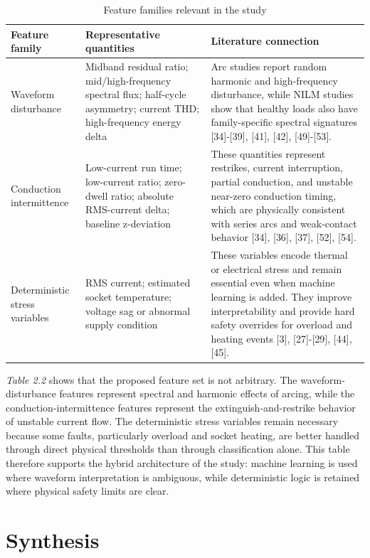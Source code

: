 \begin{table}[H]
  \centering
  \caption{Feature families relevant in the study}
  \label{tab:ch2-feature-families}
  \begin{tabular}{p{}p{}p{}}
    \toprule
    \textbf{Feature family} & \textbf{Representative quantities} & \textbf{Literature connection} \\
    \midrule
    Waveform disturbance & Midband residual ratio; mid/high-frequency spectral flux; half-cycle asymmetry; current THD; high-frequency energy delta & Arc studies report random harmonic and high-frequency disturbance, while NILM studies show that healthy loads also have family-specific spectral signatures {[}34{]}-{[}39{]}, {[}41{]}, {[}42{]}, {[}49{]}-{[}53{]}. \\
    Conduction intermittence & Low-current run time; low-current ratio; zero-dwell ratio; absolute RMS-current delta; baseline z-deviation & These quantities represent restrikes, current interruption, partial conduction, and unstable near-zero conduction timing, which are physically consistent with series arcs and weak-contact behavior {[}34{]}, {[}36{]}, {[}37{]}, {[}52{]}, {[}54{]}. \\
    Deterministic stress variables & RMS current; estimated socket temperature; voltage sag or abnormal supply condition & These variables encode thermal or electrical stress and remain essential even when machine learning is added. They improve interpretability and provide hard safety overrides for overload and heating events {[}3{]}, {[}27{]}-{[}29{]}, {[}44{]}, {[}45{]}. \\
    \bottomrule
  \end{tabular}
\end{table}

\textit{Table 2.2} shows that the proposed feature set is not arbitrary. The
waveform-disturbance features represent spectral and harmonic effects of
arcing, while the conduction-intermittence features represent the
extinguish-and-restrike behavior of unstable current flow. The
deterministic stress variables remain necessary because some faults,
particularly overload and socket heating, are better handled through
direct physical thresholds than through classification alone. This table
therefore supports the hybrid architecture of the study: machine
learning is used where waveform interpretation is ambiguous, while
deterministic logic is retained where physical safety limits are clear.

\section{Synthesis}\label{synthesis}

